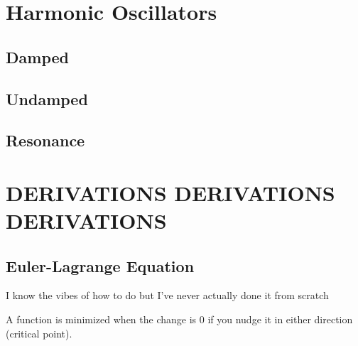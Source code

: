 \documentclass[fleqn]{article}
\begin{document}
\section{Harmonic Oscillators}
\subsection{Damped}

\subsection{Undamped}

\subsection{Resonance}

\section{DERIVATIONS DERIVATIONS DERIVATIONS}
\subsection{Euler-Lagrange Equation}
I know the vibes of how to do but I've never actually done it from scratch 

A function is minimized when the change is 0 if you nudge it in either direction 
(critical point). 
\end{document}
